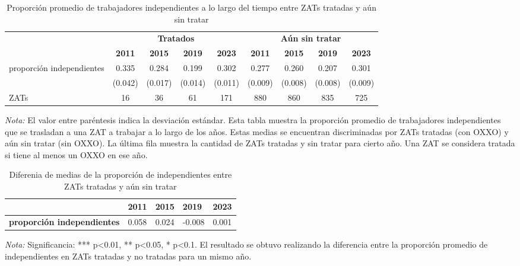 \documentclass{article}
\begin{document}
\begin{table} [H]
  \centering
  \caption{Proporción promedio de trabajadores independientes a lo largo del tiempo entre ZATs tratadas y aún sin tratar}
  \label{tab:independientes_zats}
  \begin{adjustbox}{width=\textwidth,center} %
    \begin{tabular}{lcccccccc}
      \toprule
      & \multicolumn{4}{c}{\textbf{Tratados}} & \multicolumn{4}{c}{\textbf{Aún sin tratar}} \\
      \cmidrule(lr){2-5} \cmidrule(lr){6-9}
      & \textbf{2011} & \textbf{2015} & \textbf{2019} & \textbf{2023} & \textbf{2011} & \textbf{2015} & \textbf{2019} & \textbf{2023} \\
      \midrule
      proporción independientes & 0.335 & 0.284 & 0.199 & 0.302 & 0.277 & 0.260 & 0.207 & 0.301 \\
      & (0.042) & (0.017) & (0.014) & (0.011) & (0.009) & (0.008) & (0.008) & (0.009) \\
      \midrule
      ZATs & 16 & 36 & 61 & 171 & 880 & 860 & 835 & 725 \\
      \bottomrule
    \end{tabular}
  \end{adjustbox} %
  \parbox[t]{\textwidth}{%
    \vspace{0.5em}
    \footnotesize{ \textit{Nota:} El valor entre paréntesis indica la desviación estándar. Esta tabla muestra la proporción promedio de trabajadores independientes que se trasladan a una ZAT a trabajar a lo largo de los años. Estas medias se encuentran discriminadas por ZATs tratadas (con OXXO) y aún sin tratar (sin OXXO). La última fila muestra la cantidad de ZATs tratadas y sin tratar para cierto año. Una ZAT se considera tratada si tiene al menos un OXXO en ese año.}
  }
\end{table}

\begin{table} [H]
  \centering
  \caption{Diferenia de medias de la proporción de independientes entre ZATs tratadas y aún sin tratar}
  \label{tab:proporcion_independientes}
  \begin{tabular}{l *{4}{p{1.5cm}}} %
    \toprule
    & \textbf{2011} & \textbf{2015} & \textbf{2019} & \textbf{2023} \\
    \midrule
    \textbf{proporción independientes} & 0.058 & 0.024 & -0.008 & 0.001 \\
    \bottomrule
  \end{tabular}
  \parbox[t]{\textwidth}{%
    \vspace{0.5em}
    \footnotesize{ \textit{Nota:} Significancia: *** p<0.01, ** p<0.05, * p<0.1. El resultado se obtuvo realizando la diferencia entre la proporción promedio de independientes en ZATs tratadas y no tratadas para un mismo año.}}
\end{table}
\end{document}
